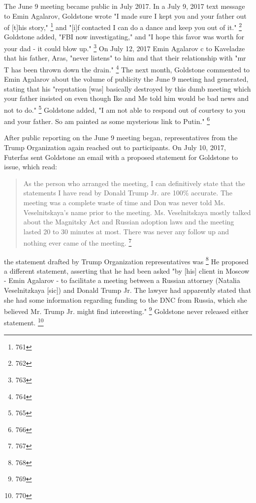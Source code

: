The June 9 meeting became public in July 2017.
In a July 9, 2017 text message to Emin Agalarov, Goldstone wrote "I made sure I kept you and your father out of [t]his story,"%
\footnote{761}
and "[i]f contacted I can do a dance and keep you out of it."%
\footnote{762}
Goldstone added, "FBI now investigating," and "I hope this favor was worth for your dad - it could blow up."%
\footnote{763}
On July 12, 2017 Emin Agalarov c to Kaveladze that his father, Aras, "never listens" to him and that their relationship with "mr T has been thrown down the drain."%
\footnote{764}
The next month, Goldstone commented to Emin Agalarov about the volume of publicity the June 9 meeting had generated, stating that his "reputation [was] basically destroyed by this dumb meeting which your father insisted on even though Ike and Me told him would be bad news and not to do."%
\footnote{765}
Goldstone added, "I am not able to respond out of courtesy to you and your father.
So am painted as some mysterious link to Putin."%
\footnote{766}

After public reporting on the June 9 meeting began, representatives from the Trump Organization again reached out to participants.
On July 10, 2017, Futerfas sent Goldstone an email with a proposed statement for Goldstone to issue, which read:

\begin{quote}
As the person who arranged the meeting, I can definitively state that the statements I have read by Donald Trump Jr. are 100\% accurate.
The meeting was a complete waste of time and Don was never told Ms. Veselnitskaya's name prior to the meeting.
Ms. Veselnitskaya mostly talked about the Magnitsky Act and Russian adoption laws and the meeting lasted 20 to 30 minutes at most.
There was never any follow up and nothing ever came of the meeting.%
\footnote{767}
\end{quote}

the statement drafted by Trump Organization representatives was
\footnote{768}
He proposed a different statement, asserting that he had been asked "by [his] client in Moscow - Emin Agalarov - to facilitate a meeting between a Russian attorney (Natalia Veselnitzkaya [sic]) and Donald Trump Jr.
The lawyer had apparently stated that she had some information regarding funding to the DNC from Russia, which she believed Mr. Trump Jr. might find interesting."%
\footnote{769}
Goldstone never released either statement.%
\footnote{770}

